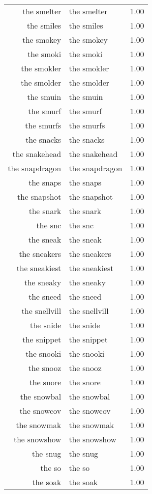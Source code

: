 \begin{table}[ht]
\begin{tabular}{rlr}
  the smelter & the smelter & 1.00 \\ 
  the smiles & the smiles & 1.00 \\ 
  the smokey & the smokey & 1.00 \\ 
  the smoki & the smoki & 1.00 \\ 
  the smokler & the smokler & 1.00 \\ 
  the smolder & the smolder & 1.00 \\ 
  the smuin & the smuin & 1.00 \\ 
  the smurf & the smurf & 1.00 \\ 
  the smurfs & the smurfs & 1.00 \\ 
  the snacks & the snacks & 1.00 \\ 
  the snakehead & the snakehead & 1.00 \\ 
  the snapdragon & the snapdragon & 1.00 \\ 
  the snaps & the snaps & 1.00 \\ 
  the snapshot & the snapshot & 1.00 \\ 
  the snark & the snark & 1.00 \\ 
  the snc & the snc & 1.00 \\ 
  the sneak & the sneak & 1.00 \\ 
  the sneakers & the sneakers & 1.00 \\ 
  the sneakiest & the sneakiest & 1.00 \\ 
  the sneaky & the sneaky & 1.00 \\ 
  the sneed & the sneed & 1.00 \\ 
  the snellvill & the snellvill & 1.00 \\ 
  the snide & the snide & 1.00 \\ 
  the snippet & the snippet & 1.00 \\ 
  the snooki & the snooki & 1.00 \\ 
  the snooz & the snooz & 1.00 \\ 
  the snore & the snore & 1.00 \\ 
  the snowbal & the snowbal & 1.00 \\ 
  the snowcov & the snowcov & 1.00 \\ 
  the snowmak & the snowmak & 1.00 \\ 
  the snowshow & the snowshow & 1.00 \\ 
  the snug & the snug & 1.00 \\ 
  the so & the so & 1.00 \\ 
  the soak & the soak & 1.00 \\ 

\end{tabular}
\end{table}
